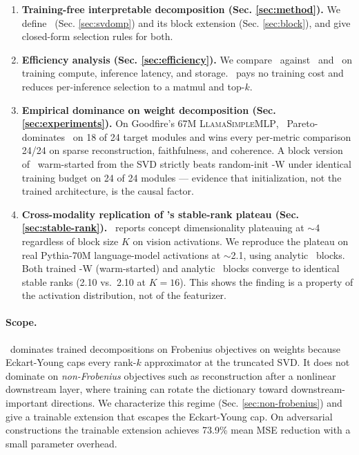 \begin{enumerate}
\item \textbf{Training-free interpretable decomposition (Sec. \ref{sec:method}).} We define \svdomp\ (Sec. \ref{sec:svdomp}) and its block extension (Sec. \ref{sec:block}), and give closed-form selection rules for both.

\item \textbf{Efficiency analysis (Sec. \ref{sec:efficiency}).} We compare \svdomp\ against \vpd\ and \bsf\ on training compute, inference latency, and storage. \svdomp\ pays no training cost and reduces per-inference selection to a matmul and top-$k$.

\item \textbf{Empirical dominance on weight decomposition (Sec. \ref{sec:experiments}).} On Goodfire's 67M \textsc{LlamaSimpleMLP}, \svdomp\ Pareto-dominates \vpd\ on 18 of 24 target modules and wins every per-metric comparison 24/24 on sparse reconstruction, faithfulness, and coherence. A block version of \bsf\ warm-started from the SVD strictly beats random-init \bsf-W under identical training budget on 24 of 24 modules --- evidence that initialization, not the trained architecture, is the causal factor.

\item \textbf{Cross-modality replication of \bsf's stable-rank plateau (Sec. \ref{sec:stable-rank}).} \bsf\ reports concept dimensionality plateauing at $\sim$4 regardless of block size $K$ on vision activations. We reproduce the plateau on real Pythia-70M language-model activations at $\sim$2.1, using analytic \svdomp\ blocks. Both trained \bsf-W (warm-started) and analytic \svdomp\ blocks converge to identical stable ranks (2.10 vs.\ 2.10 at $K=16$). This shows the finding is a property of the activation distribution, not of the featurizer.
\end{enumerate}

\paragraph{Scope.} \svdomp\ dominates trained decompositions on Frobenius objectives on weights because Eckart-Young caps every rank-$k$ approximator at the truncated SVD. It does not dominate on \emph{non-Frobenius} objectives such as reconstruction after a nonlinear downstream layer, where training can rotate the dictionary toward downstream-important directions. We characterize this regime (Sec. \ref{sec:non-frobenius}) and give a trainable extension that escapes the Eckart-Young cap. On adversarial constructions the trainable extension achieves 73.9\% mean MSE reduction with a small parameter overhead.
